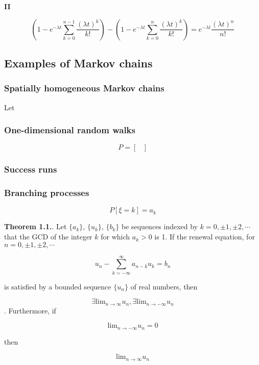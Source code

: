 \documentclass[12pt]{article}
\theoremstyle{nonumberbreak}
\begin{document}
\textbf{II}

$$
(1 - e^{-\lambda t} \sum_{k=0}^{n-1} \frac{(\lambda t)^k}{k!}) - (1 - e^{-\lambda t} \sum_{k=0}^n \frac{(\lambda t)^k}{k!}) = e^{-\lambda t} \frac{(\lambda t)^n}{n!}
$$







\subsection{Examples of Markov chains}


\subsubsection{Spatially homogeneous Markov chains}

Let



\subsubsection{One-dimensional random walks}

$$
P = \begin{bmatrix}

\end{bmatrix}
$$









\subsubsection{Success runs}



\subsubsection{Branching processes}

$$
P[\xi = k] = a_k
$$





\begin{theorem}
\textbf{Theorem 1.1.}. Let $\{a_k \}$, $\{u_k \}$, $\{b_k \}$ be sequences indexed by $k=0, \pm 1, \pm 2, \cdots$ that the GCD of the integer $k$ for which $a_k >0$ is 1. If the renewal equation, for $n = 0, \pm 1, \pm 2, \cdots$

$$
u_n - \sum_{k=-\infty}^\infty a_{n-k} u_k = b_n
$$

is satisfied by a bounded sequence $\{ u_n\}$ of real numbers, then 

$$
\exists \mathrm{lim}_{n\to \infty} u_n, \exists \mathrm{lim}_{n\to -\infty} u_n
$$. Furthermore, if

$$
\mathrm{lim}_{n\to - \infty} u_n = 0
$$

then 

$$
\mathrm{lim}_{n\to \infty} u_n
$$

\end{theorem}
\end{document}

